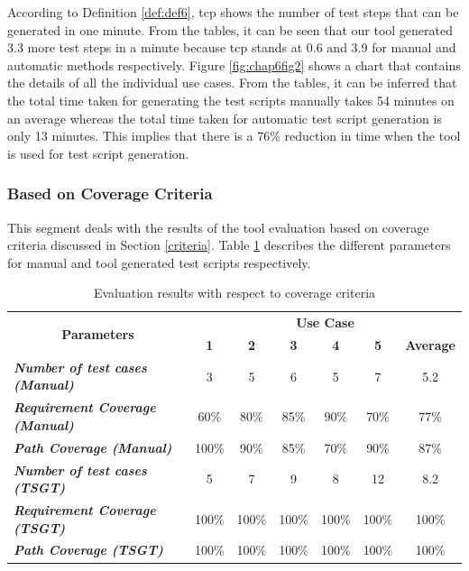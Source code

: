 According to Definition \ref{def:def6}, \gls{tcp} shows the number of test steps that can be generated in one minute. From the tables, it can be seen that our tool generated 3.3 more test steps in a minute because \gls{tcp} stands at 0.6 and 3.9 for manual and automatic methods respectively. Figure \ref{fig:chap6fig2} shows a chart that contains the details of all the individual use cases.
From the tables, it can be inferred that the total time taken for generating the test scripts manually takes 54 minutes on an average whereas the total time taken for automatic test script generation is only 13 minutes. This implies that there is a 76\% reduction in time when the tool is used for test script generation.

\subsubsection{Based on Coverage Criteria}

This segment deals with the results of the tool evaluation based on coverage criteria discussed in Section \ref{criteria}. Table \ref{tab:coverageresults} describes the different parameters for manual and tool generated test scripts respectively.
\begin{table}[htbp]
  \centering
  \caption{Evaluation results with respect to coverage criteria}
  	\begin{adjustbox}{width=1\textwidth}
    \begin{tabular}{|l|c|c|c|c|c|c|}
    \toprule
    \multicolumn{1}{|c|}{\multirow{2}[4]{*}{\textbf{Parameters}}} & \multicolumn{6}{c|}{\textbf{Use Case }} \\
\cmidrule{2-7}          & \textbf{1} & \textbf{2} & \textbf{3} & \textbf{4} & \textbf{5} & \textbf{Average} \\
    \midrule
    \textit{\textbf{Number of test cases (Manual)}} & 3     & 5     & 6     & 5     & 7     & 5.2 \\
    \midrule
    \textit{\textbf{Requirement Coverage  (Manual)}} & 60\%  & 80\%  & 85\%  & 90\%  & 70\%  & 77\% \\
    \midrule
    \textit{\textbf{Path Coverage  (Manual)}} & 100\% & 90\%  & 85\%  & 70\%  & 90\%  & 87\% \\
    \midrule
    \textit{\textbf{Number of test cases  (TSGT)}} & 5     & 7     & 9     & 8     & 12    & 8.2 \\
    \midrule
    \textit{\textbf{Requirement Coverage (TSGT)}} & 100\% & 100\% & 100\% & 100\% & 100\% & 100\% \\
    \midrule
    \textit{\textbf{Path Coverage (TSGT)}} & 100\% & 100\% & 100\% & 100\% & 100\% & 100\% \\
    \bottomrule
    \end{tabular}%
    \end{adjustbox}
  \label{tab:coverageresults}%
\end{table}%

